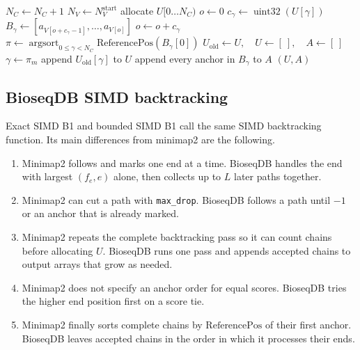 \begin{algorithm}[H]
\begin{algorithmic}[1]
          \EndIf
          \State \(N_C\gets N_C+1\)
        \Else
          \State \(N_V\gets N_V^{\mathrm{start}}\)
        \EndIf
      \EndIf
    \EndFor
      \State allocate \(U[0\ldots N_C)\)
    \EndIf
  \EndFor
  \State \(o\gets0\)
    \State \(c_\gamma\gets\operatorname{uint32}(U[\gamma])\)
    \State \(B_\gamma\gets
          [a_{V[o+c_\gamma-1]},\ldots,a_{V[o]}]\)
    \State \(o\gets o+c_\gamma\)
  \EndFor
  \State \(\pi\gets
        \operatorname*{argsort}_{0\leq\gamma<N_C}\text{ReferencePos}(B_\gamma[0])\)
  \State \(U_{\mathrm{old}}\gets U,\quad U\gets[\ ],\quad A\gets[\ ]\)
    \State \(\gamma\gets\pi_m\)
    \State append \(U_{\mathrm{old}}[\gamma]\) to \(U\)
    \State append every anchor in \(B_\gamma\) to \(A\)
  \EndFor
  \State \Return \((U,A)\)
\end{algorithmic}
\end{algorithm}



\subsection{BioseqDB SIMD backtracking}

Exact SIMD B1 and bounded SIMD B1 call the same SIMD backtracking function.
Its main differences from minimap2 are the following.

\begin{enumerate}
  \item Minimap2 follows and marks one end at a time. BioseqDB handles the end
        with largest \((f_e,e)\) alone, then collects up to \(L\) later paths
        together.
  \item Minimap2 can cut a path with \texttt{max\_drop}. BioseqDB follows a
        path until \(-1\) or an anchor that is already marked.
  \item Minimap2 repeats the complete backtracking pass so it can count chains
        before allocating \(U\). BioseqDB runs one pass and appends accepted
        chains to output arrays that grow as needed.
  \item Minimap2 does not specify an anchor order for equal scores.
        BioseqDB tries the higher end position first on a score tie.
  \item Minimap2 finally sorts complete chains by $\text{ReferencePos}$ of their first
        anchor.
        BioseqDB leaves accepted chains in the order in which it processes
        their ends.
\end{enumerate}

